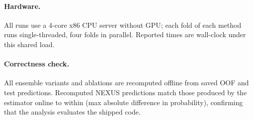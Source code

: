 \paragraph{Hardware.} All runs use a 4-core x86 CPU server without GPU; each
fold of each method runs single-threaded, four folds in parallel. Reported
times are wall-clock under this shared load.

\paragraph{Correctness check.} All ensemble variants and ablations are recomputed
offline from saved OOF and test predictions. Recomputed NEXUS predictions match
those produced by the estimator online to within \RecomputeDiff{} (max absolute
difference in probability), confirming that the analysis evaluates the shipped
code.
